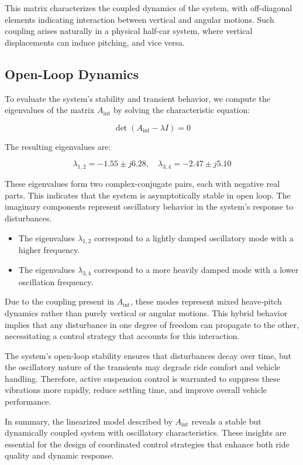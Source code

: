 \documentclass[]{report}
\begin{document}
	This matrix characterizes the coupled dynamics of the system, with off-diagonal elements indicating interaction between vertical and angular motions. Such coupling arises naturally in a physical half-car system, where vertical displacements can induce pitching, and vice versa.
	
	\subsection{Open-Loop Dynamics}
	
	To evaluate the system's stability and transient behavior, we compute the eigenvalues of the matrix \( A_{\text{int}} \) by solving the characteristic equation:
	
	\[
	\det(A_{\text{int}} - \lambda I) = 0
	\]
	
	The resulting eigenvalues are:
	
	\[
	\lambda_{1,2} = -1.55 \pm j6.28, \quad \lambda_{3,4} = -2.47 \pm j5.10
	\]
	
	These eigenvalues form two complex-conjugate pairs, each with negative real parts. This indicates that the system is asymptotically stable in open loop. The imaginary components represent oscillatory behavior in the system's response to disturbances.
	
	\begin{itemize}
		\item The eigenvalues \( \lambda_{1,2} \) correspond to a lightly damped oscillatory mode with a higher frequency.
		\item The eigenvalues \( \lambda_{3,4} \) correspond to a more heavily damped mode with a lower oscillation frequency.
	\end{itemize}
	
	Due to the coupling present in \( A_{\text{int}} \), these modes represent mixed heave-pitch dynamics rather than purely vertical or angular motions. This hybrid behavior implies that any disturbance in one degree of freedom can propagate to the other, necessitating a control strategy that accounts for this interaction.
	
	The system’s open-loop stability ensures that disturbances decay over time, but the oscillatory nature of the transients may degrade ride comfort and vehicle handling. Therefore, active suspension control is warranted to suppress these vibrations more rapidly, reduce settling time, and improve overall vehicle performance.
	
	In summary, the linearized model described by \( A_{\text{int}} \) reveals a stable but dynamically coupled system with oscillatory characteristics. These insights are essential for the design of coordinated control strategies that enhance both ride quality and dynamic response.
	
\end{document}
